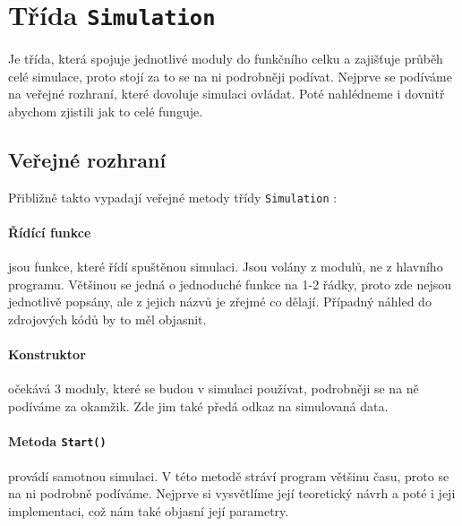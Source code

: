 
\section{Třída \texttt{Simulation}}
Je třída, která spojuje jednotlivé moduly do funkčního celku a zajišťuje průběh celé simulace, proto stojí za to se na ni podrobněji podívat. Nejprve se podíváme na veřejné rozhraní, které dovoluje simulaci ovládat. Poté nahlédneme i dovnitř abychom zjistili jak to celé funguje.
\subsection{Veřejné rozhraní}
Přibližně takto vypadají veřejné metody třídy \texttt{Simulation} :
\paragraph{Řídící funkce}
jsou funkce, které řídí spuštěnou simulaci. Jsou volány z modulů, ne z hlavního programu. Většinou se jedná o jednoduché funkce na 1-2 řádky, proto zde nejsou jednotlivě popsány, ale z jejich názvů je zřejmé co dělají. Případný náhled do zdrojových kódů by to měl objasnit.
\paragraph{Konstruktor}
očekává 3 moduly, které se budou v simulaci používat, podrobněji se na ně podíváme za okamžik. Zde jim také předá odkaz na simulovaná data.
\paragraph{Metoda \texttt{Start()}}
provádí samotnou simulaci. V této metodě stráví program většinu času, proto se na ni podrobně podíváme. Nejprve si vysvětlíme její teoretický návrh a poté i jeji implementaci, což nám také objasní její parametry.
